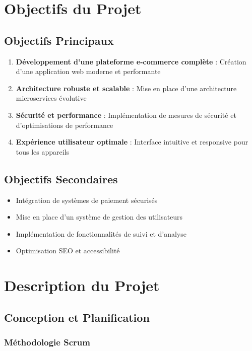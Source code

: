 \documentclass[12pt,a4paper]{article}
\begin{document}
\section{Objectifs du Projet}

\subsection{Objectifs Principaux}
\begin{enumerate}
    \item \textbf{Développement d'une plateforme e-commerce complète} : Création d'une application web moderne et performante
    \item \textbf{Architecture robuste et scalable} : Mise en place d'une architecture microservices évolutive
    \item \textbf{Sécurité et performance} : Implémentation de mesures de sécurité et d'optimisations de performance
    \item \textbf{Expérience utilisateur optimale} : Interface intuitive et responsive pour tous les appareils
\end{enumerate}

\subsection{Objectifs Secondaires}
\begin{itemize}
    \item Intégration de systèmes de paiement sécurisés
    \item Mise en place d'un système de gestion des utilisateurs
    \item Implémentation de fonctionnalités de suivi et d'analyse
    \item Optimisation SEO et accessibilité
\end{itemize}

\section{Description du Projet}

\subsection{Conception et Planification}

\subsubsection{Méthodologie Scrum}
\end{document}
